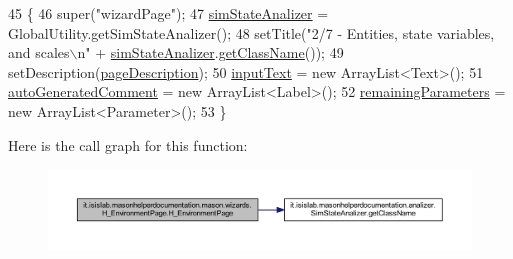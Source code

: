 \begin{DoxyCode}
45                                \{
46         super(\textcolor{stringliteral}{"wizardPage"});
47         \hyperlink{classit_1_1isislab_1_1masonhelperdocumentation_1_1mason_1_1wizards_1_1_h___environment_page_a7c2fe727aad8e12d87fd87203f4f8ec9}{simStateAnalizer} = GlobalUtility.getSimStateAnalizer(); 
48         setTitle(\textcolor{stringliteral}{"2/7 - Entities, state variables, and scales\(\backslash\)n"} + 
      \hyperlink{classit_1_1isislab_1_1masonhelperdocumentation_1_1mason_1_1wizards_1_1_h___environment_page_a7c2fe727aad8e12d87fd87203f4f8ec9}{simStateAnalizer}.\hyperlink{classit_1_1isislab_1_1masonhelperdocumentation_1_1analizer_1_1_sim_state_analizer_abc95a350e9935fa01ac2fa2344372472}{getClassName}());
49         setDescription(\hyperlink{classit_1_1isislab_1_1masonhelperdocumentation_1_1mason_1_1wizards_1_1_h___environment_page_ac8bda07b4ed1d63f8802efd712de59a0}{pageDescription});
50         \hyperlink{classit_1_1isislab_1_1masonhelperdocumentation_1_1mason_1_1wizards_1_1_h___environment_page_a297c64d886f958c23f954db7b953a46f}{inputText} = \textcolor{keyword}{new} ArrayList<Text>();
51         \hyperlink{classit_1_1isislab_1_1masonhelperdocumentation_1_1mason_1_1wizards_1_1_h___environment_page_a5495002868c1d72f31f79a3e584fdd60}{autoGeneratedComment} = \textcolor{keyword}{new} ArrayList<Label>();
52         \hyperlink{classit_1_1isislab_1_1masonhelperdocumentation_1_1mason_1_1wizards_1_1_h___environment_page_a3bfb6dff5b562361a410cd31ff8815ba}{remainingParameters} = \textcolor{keyword}{new} ArrayList<Parameter>();
53     \}
\end{DoxyCode}


Here is the call graph for this function\-:
\nopagebreak
\begin{figure}[H]
\begin{center}
\leavevmode
\includegraphics[width=350pt]{classit_1_1isislab_1_1masonhelperdocumentation_1_1mason_1_1wizards_1_1_h___environment_page_a3a1a493e45a75cbea547a1fea9405b18_cgraph}
\end{center}
\end{figure}




